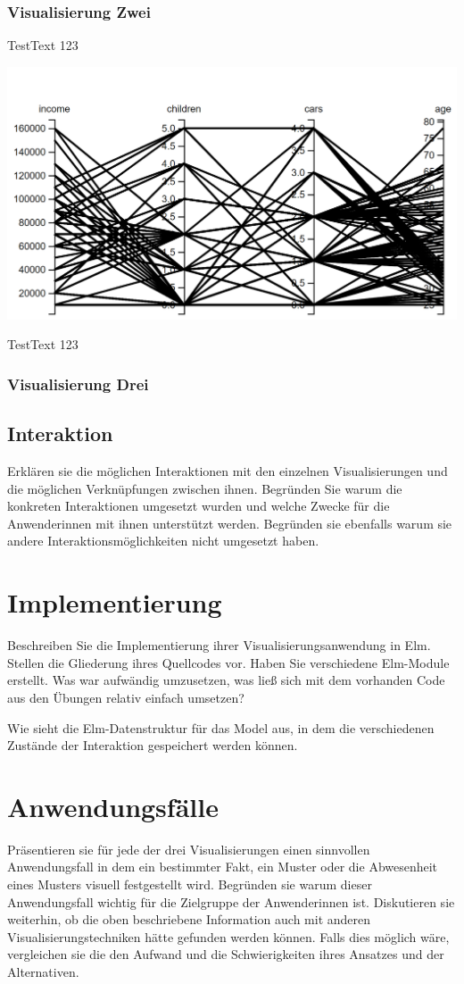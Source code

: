 \documentclass[usegeometry=true]{scrartcl}
\begin{document}
\subsubsection{Visualisierung Zwei}

TestText 123

\includegraphics{parallelcoordinates}

TestText 123
\subsubsection{Visualisierung Drei}

\subsection{Interaktion}
Erklären sie die möglichen Interaktionen mit den einzelnen Visualisierungen und die möglichen Verknüpfungen zwischen ihnen. Begründen Sie warum die konkreten Interaktionen umgesetzt wurden und welche Zwecke für die Anwenderinnen mit ihnen unterstützt werden. Begründen sie ebenfalls warum sie andere Interaktionsmöglichkeiten nicht umgesetzt haben. 

\section{Implementierung}
Beschreiben Sie die Implementierung ihrer Visualisierungsanwendung in Elm. Stellen die Gliederung ihres Quellcodes vor. Haben Sie verschiedene Elm-Module erstellt. Was war aufwändig umzusetzen, was ließ sich mit dem vorhanden Code aus den Übungen relativ einfach umsetzen? 

Wie sieht die Elm-Datenstruktur für das Model aus, in dem die verschiedenen Zustände der Interaktion gespeichert werden können.

\section{Anwendungsfälle}
Präsentieren sie für jede der drei Visualisierungen einen sinnvollen Anwendungsfall in dem ein bestimmter Fakt, ein Muster oder die Abwesenheit eines Musters visuell festgestellt wird. Begründen sie warum dieser Anwendungsfall wichtig für die Zielgruppe der Anwenderinnen ist. Diskutieren sie weiterhin, ob die oben beschriebene Information auch mit anderen Visualisierungstechniken hätte gefunden werden können. Falls dies möglich wäre, vergleichen sie die den Aufwand und die Schwierigkeiten ihres Ansatzes und der Alternativen. 
\end{document}
